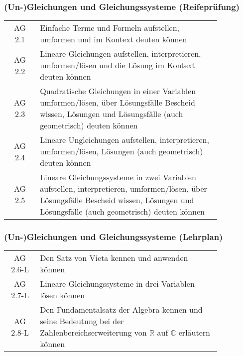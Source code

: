 \documentclass[a4paper,12pt]{article}
\begin{document}
\subsubsection{(Un-)Gleichungen und Gleichungssysteme (Reifeprüfung)}

\begin{tabular}{cp{0.85\linewidth}}
AG 2.1 &Einfache Terme und Formeln aufstellen, umformen und im Kontext deuten können\\

AG 2.2 & Lineare Gleichungen aufstellen, interpretieren, umformen/lösen und die Lösung im Kontext deuten können \\

AG 2.3 & Quadratische Gleichungen in einer Variablen umformen/lösen, über Lösungsfälle Bescheid wissen, Lösungen und Lösungsfälle (auch geometrisch) deuten können \\

AG 2.4 & Lineare Ungleichungen aufstellen, interpretieren, umformen/lösen, Lösungen (auch geometrisch) deuten können\\

AG 2.5 & Lineare Gleichungssysteme in zwei Variablen aufstellen, interpretieren, umformen/lösen, über Lösungsfälle Bescheid wissen, Lösungen und Lösungsfälle (auch geometrisch) deuten können \\
\end{tabular}


\subsubsection{(Un-)Gleichungen und Gleichungssysteme (Lehrplan)}
\begin{em}
\begin{tabular}{cp{0.85\linewidth}}
AG 2.6-L & Den Satz von Vieta kennen und anwenden können\\

AG 2.7-L & Lineare Gleichungssysteme in drei Variablen lösen können \\

AG 2.8-L & Den Fundamentalsatz der Algebra kennen und seine Bedeutung bei der Zahlenbereichserweiterung von $\mathbb{R}$ auf $\mathbb{C}$ erläutern können\\
\end{tabular}
\end{em}
\end{document}
